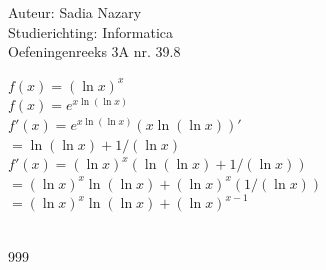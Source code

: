 \documentclass[a4paper]{article}
\begin{document}
  
\noindent \large Auteur: Sadia Nazary  \\
\noindent \large Studierichting: Informatica\\
\noindent \large Oefeningenreeks 3A nr. 39.8\\

\medskip

\normalsize

$f(x)=(\ln x)^x$ \\

$f(x)=e^{x\ln(\ln x)}$ \\

$f'(x)=e^{x\ln(\ln x)}(x\ln(\ln x))'$ \\

$=\ln(\ln x)+1/(\ln x)$ \\

$f'(x)=(\ln x)^x(\ln(\ln x)+1/(\ln x))$ \\

$=(\ln x)^x\ln(\ln x)+(\ln x)^x(1/(\ln x))$ \\

$=(\ln x)^x\ln(\ln x)+(\ln x)^{x-1}$ \\

 \\

\begin{thebibliography}{999}
\end{thebibliography}
\end{document}
